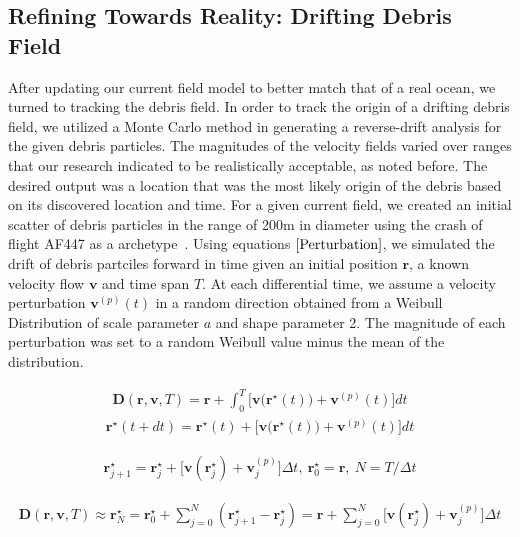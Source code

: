 \documentclass[pre,12pt]{revtex4-1}
\begin{document}
\subsection{Refining Towards Reality: Drifting Debris Field}\label{NumericsRefine}

After updating our current field model to better match that of a real ocean, we turned to tracking the debris field. In order to track the origin of a drifting debris field, we utilized a Monte Carlo method in generating a reverse-drift analysis for the given debris particles. The magnitudes of the velocity fields varied over ranges that our research indicated to be realistically acceptable, as noted before. The desired output was a location that was the most likely origin of the debris based on its discovered location and time. For a given current field, we created an initial scatter of debris particles in the range of 200m in diameter using the crash of flight AF447 as a archetype~\cite{MetronAnalysis}. Using equations$~\eqref{Perturbation}$, we simulated the drift of debris partciles forward in time given an initial position $\mathbf{r}$, a known velocity flow $\mathbf{v}$ and time span $T$. At each differential time, we assume a velocity perturbation $\mathbf{v}^{(p)}(t)$ in a random direction obtained from a Weibull Distribution of scale parameter $a$ and shape parameter 2. The magnitude of each perturbation was set to a random Weibull value minus the mean of the distribution.

\begin{align}\label{Perturbation} \mathbf{D}(\mathbf{r},\mathbf{v},T) = \mathbf{r} + \int_0^T \big[\mathbf{v}\big(\mathbf{r}^\star(t)\big) + \mathbf{v}^{(p)}(t)\big]dt \end{align}
\begin{align} \label{rstaran}\mathbf{r}^\star(t + dt) = \mathbf{r}^\star(t) + \big[\mathbf{v}\big(\mathbf{r}^\star(t)\big) + \mathbf{v}^{(p)}(t)\big]dt \end{align}

\begin{align} \label{rstarnum} \mathbf{r}^\star_{j+1} = \mathbf{r}^\star_j + \big[\mathbf{v}(\mathbf{r}^\star_j) + \mathbf{v}^{(p)}_j\big]\Delta t, \ \mathbf{r}^\star_0 = \mathbf{r}, \ N = T / \Delta t \end{align}

\begin{align} \label{pertnum} \mathbf{D}(\mathbf{r},\mathbf{v},T) \approx \mathbf{r}_N^\star = \mathbf{r}_0^\star + \sum_{j=0}^N (\mathbf{r}^\star_{j+1}-\mathbf{r}^\star_j) = \mathbf{r} + \sum_{j = 0}^N \big[\mathbf{v}(\mathbf{r}^\star_j) + \mathbf{v}^{(p)}_j\big]\Delta t \end{align}
\end{document}
